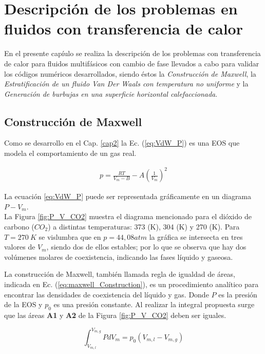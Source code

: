 \chapter{Descripción de los problemas en fluidos con transferencia de calor }
\graphicspath{{figs/cap4/}}
\label{cap4}

En el presente capíulo se realiza la descripción de los problemas con transferencia de calor para fluidos multifásicos con cambio de fase llevados a cabo para validar los códigos numéricos desarrollados, siendo éstos la \textit{Construcción de Maxwell}, la \textit{Estratificación de un fluido Van Der Waals con temperatura no uniforme} y la \textit{Generación de burbujas en una superficie horizontal calefaccionada}.

\section{Construcción de Maxwell}

Como se desarrollo en el Cap. \ref{cap2} la Ec. (\ref{eq:VdW_P}) es una EOS que modela el comportamiento de un gas real.

\begin{align*}
	p = \frac{R T}{V_m - B} - A {(\frac{1}{V_m})}^2
\end{align*}

La ecuación \ref{eq:VdW_P} puede ser representada gráficamente en un diagrama $P - V_m$. \\ La Figura \ref{fig:P_V_CO2} muestra el diagrama mencionado para el dióxido de carbono ($CO_2$) a distintas temperaturas: 373 (K), 304 (K) y 270 (K). Para $T = 270 \> K$ se vislumbra que en $p = 44,08 atm$ la gráfica se intersecta en tres valores de $V_m$, siendo dos de ellos estables; por lo que se observa que hay dos volúmenes molares de coexistencia, indicando las fases líquido y gaseosa.

La construcción de Maxwell, también llamada regla de igualdad de áreas, indicada en Ec. (\ref{eq:maxwell_Construction}), es un procedimiento analítico para encontrar las densidades de coexistencia del líquido y gas. Donde $P$ es la presión de la EOS y $p_0$ es una presión constante. Al realizar la integral propuesta surge que las áreas \textbf{A1} y \textbf{A2} de la Figura \ref{fig:P_V_CO2} deben ser iguales.

\begin{equation}
\int_{V_{m,l}}^{V_{m,g}} P d V_m = p_0 (V_{m,l} -  V_{m,g})
\label{eq:maxwell_Construction}
\end{equation}

